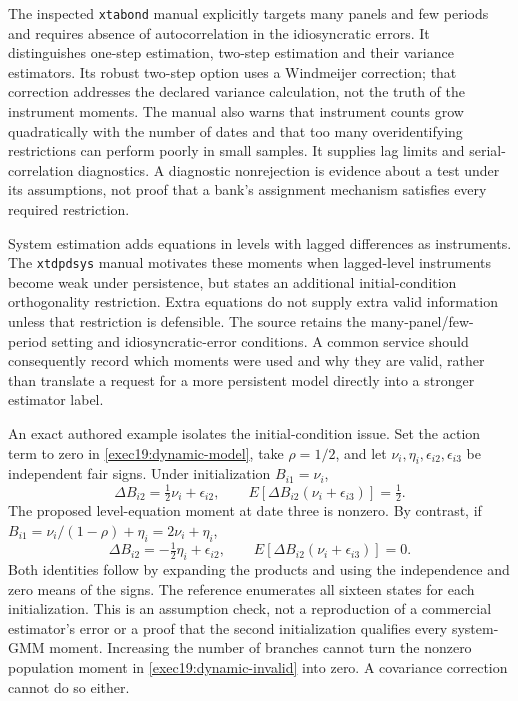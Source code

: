 The inspected \texttt{xtabond} manual explicitly targets many panels and
few periods and requires absence of autocorrelation in the idiosyncratic
errors. It distinguishes one-step estimation, two-step estimation and their
variance estimators. Its robust two-step option uses a Windmeijer correction;
that correction addresses the declared variance calculation, not the truth
of the instrument moments. The manual also warns that instrument counts grow
quadratically with the number of dates and that too many overidentifying
restrictions can perform poorly in small samples. It supplies lag limits
and serial-correlation diagnostics. A diagnostic nonrejection is evidence
about a test under its assumptions, not proof that a bank's assignment
mechanism satisfies every required restriction.~\citep{exec19_dynamic_stata_ab}

System estimation adds equations in levels with lagged differences as
instruments. The \texttt{xtdpdsys} manual motivates these moments when
lagged-level instruments become weak under persistence, but states an
additional initial-condition orthogonality restriction. Extra equations do
not supply extra valid information unless that restriction is defensible.
The source retains the many-panel/few-period setting and idiosyncratic-error
conditions. A common service should consequently record which moments were
used and why they are valid, rather than translate a request for a more
persistent model directly into a stronger estimator label.
\citep{exec19_dynamic_stata_system}

An exact authored example isolates the initial-condition issue. Set the
action term to zero in \eqref{exec19:dynamic-model}, take $\rho=1/2$, and
let $\nu_i,\eta_i,\epsilon_{i2},\epsilon_{i3}$ be independent fair
signs. Under initialization $B_{i1}=\nu_i$,
\begin{equation}
 \Delta B_{i2}=\tfrac12\nu_i+\epsilon_{i2},\qquad
 E[\Delta B_{i2}(\nu_i+\epsilon_{i3})]=\tfrac12.
 \label{exec19:dynamic-invalid}
\end{equation}
The proposed level-equation moment at date three is nonzero. By contrast,
if $B_{i1}=\nu_i/(1-\rho)+\eta_i=2\nu_i+\eta_i$,
\begin{equation}
 \Delta B_{i2}=-\tfrac12\eta_i+\epsilon_{i2},\qquad
 E[\Delta B_{i2}(\nu_i+\epsilon_{i3})]=0.
 \label{exec19:dynamic-valid}
\end{equation}
Both identities follow by expanding the products and using the independence
and zero means of the signs. The reference enumerates all sixteen states
for each initialization. This is an assumption check, not a reproduction of
a commercial estimator's error or a proof that the second initialization
qualifies every system-GMM moment. Increasing the number of branches cannot
turn the nonzero population moment in \eqref{exec19:dynamic-invalid} into
zero. A covariance correction cannot do so either.
\citep{exec19_dynamic_reference}

